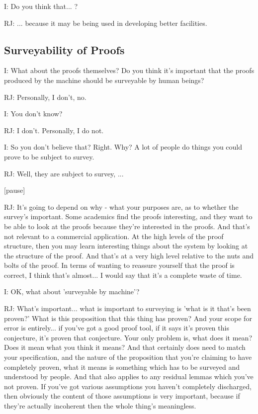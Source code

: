 \documentclass[10pt,titlepage]{book}
\begin{document}
I: Do you think that... ?

RJ: ... because it may be being used in developing better facilities.

\subsection{Surveyability of Proofs}

I: What about the proofs themselves?
Do you think it's important that the proofs produced by the machine should be surveyable by human beings?

RJ: Personally, I don't, no.

I: You don't know?

RJ: I don't.
Personally, I do not.

I: So you don't believe that?
Right.
Why?
A lot of people do things you could prove to be subject to survey.

RJ: Well, they are subject to survey, ... 

[pause]

RJ: It's going to depend on why - what your purposes are, as to whether the survey's important.
Some academics find the proofs interesting, and they want to be able to look at the proofs because they're interested in the proofs.
And that's not relevant to a commercial application.
At the high levels of the proof structure, then you may learn interesting things about the system by looking at the structure of the proof.
And that's at a very high level relative to the nuts and bolts of the proof.
In terms of wanting to reassure yourself that the proof is correct, I think that's almost... I would say that it's a complete waste of time.

I: OK, what about 'surveyable by machine'?

RJ: What's important... what is important to surveying is 'what is it that's been proven?' What is this proposition that this thing has proven? And your scope for error is entirely... if you've got a good proof tool, if it says it's proven this conjecture, it's proven that conjecture. Your only problem is, what does it mean? Does it mean what you think it means? And that certainly does need to match your specification, and the nature of the proposition that you're claiming to have completely proven, what it means is something which has to be surveyed and understood by people. And that also applies to any residual lemmas which you've not proven. If you've got various assumptions you haven't completely discharged, then obviously the content of those assumptions is very important, because if they're actually incoherent then the whole thing's meaningless.
\end{document}

